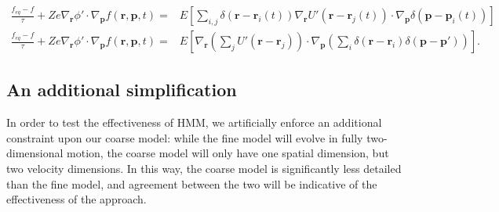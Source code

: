 \documentclass{article}
\begin{document}
\begin{align*}\frac{f_{eq}-f}{\tau}+Ze\nabla_\mathbf{r}\phi'\cdot\nabla_\mathbf{p}f(\mathbf{r},\mathbf{p},t)=&E\left[\sum_{i,j}\delta(\mathbf{r}-\mathbf{r}_i(t))\nabla_\mathbf{r}U'(\mathbf{r}-\mathbf{r}_j(t))\cdot\nabla_\mathbf{p}\delta(\mathbf{p}-\mathbf{p}_i(t))\right]\\
\frac{f_{eq}-f}{\tau}+Ze\nabla_\mathbf{r}\phi'\cdot\nabla_\mathbf{p}f(\mathbf{r},\mathbf{p},t)=&E\left[\nabla_\mathbf{r}\left(\sum_jU'(\mathbf{r}-\mathbf{r}_j)\right)\cdot\nabla_\mathbf{p}\left(\sum_i\delta(\mathbf{r}-\mathbf{r}_i)\delta(\mathbf{p}-\mathbf{p}')\right)\right].
\end{align*}

\subsection{An additional simplification}

In order to test the effectiveness of HMM, we artificially enforce an additional constraint upon our coarse model: while the fine model will evolve in fully two-dimensional motion, the coarse model will only have one spatial dimension, but two velocity dimensions. In this way, the coarse model is significantly less detailed than the fine model, and agreement between the two will be indicative of the effectiveness of the approach.
\end{document}
